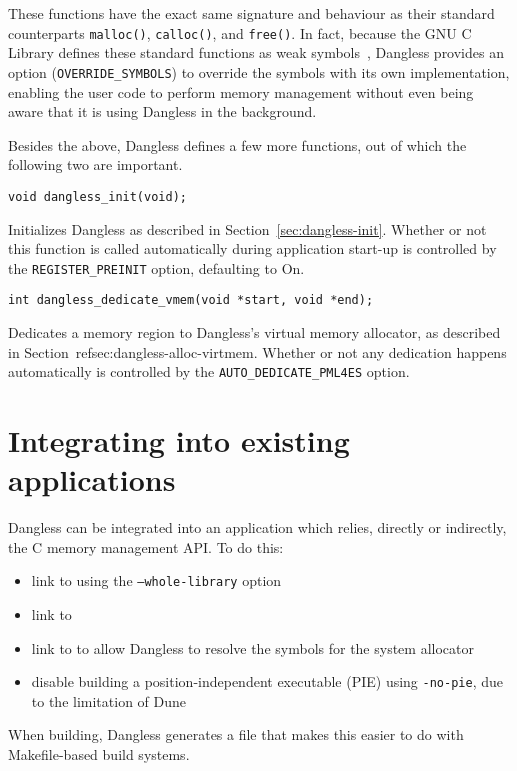 These functions have the exact same signature and behaviour as their standard counterparts \lstinline!malloc()!, \lstinline!calloc()!, and \lstinline!free()!. In fact, because the GNU C Library defines these standard functions as weak symbols~\cite{glibc-malloc-is-weak}, Dangless provides an option (\lstinline!OVERRIDE_SYMBOLS!) to override the symbols with its own implementation, enabling the user code to perform memory management without even being aware that it is using Dangless in the background.

Besides the above, Dangless defines a few more functions, out of which the following two are important.

\begin{lstlisting}
void dangless_init(void);
\end{lstlisting}

Initializes Dangless as described in Section~\ref{sec:dangless-init}. Whether or not this function is called automatically during application start-up is controlled by the \lstinline!REGISTER_PREINIT! option, defaulting to On.

\begin{lstlisting}
int dangless_dedicate_vmem(void *start, void *end);
\end{lstlisting}

Dedicates a memory region to Dangless's virtual memory allocator, as described in Section~ref{sec:dangless-alloc-virtmem}.
Whether or not any dedication happens automatically is controlled by the \lstinline!AUTO_DEDICATE_PML4ES! option.

\section{Integrating into existing applications}

Dangless can be integrated into an application which relies, directly or indirectly, the C memory management API. To do this:
\begin{itemize}
	\item link to  using the \texttt{--whole-library} option
	\item link to 
	\item link to  to allow Dangless to resolve the symbols for the system allocator
	\item disable building a position-independent executable (PIE) using \texttt{-no-pie}, due to the limitation of Dune
\end{itemize}

When building, Dangless generates a  file that makes this easier to do with Makefile-based build systems.
